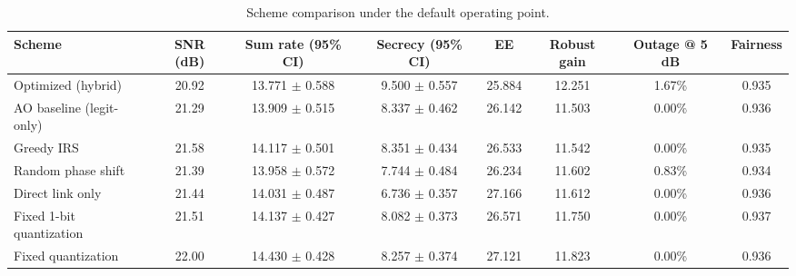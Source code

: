 \begin{table}[t]
\caption{Scheme comparison under the default operating point.}
\label{tab:comparison}
\centering
\begin{tabular}{lccccccc}
\hline
Scheme & SNR (dB) & Sum rate (95\% CI) & Secrecy (95\% CI) & EE & Robust gain & Outage @ 5 dB & Fairness \\
\hline
Optimized (hybrid) & 20.92 & 13.771 $\pm$ 0.588 & 9.500 $\pm$ 0.557 & 25.884 & 12.251 & 1.67\% & 0.935 \\
AO baseline (legit-only) & 21.29 & 13.909 $\pm$ 0.515 & 8.337 $\pm$ 0.462 & 26.142 & 11.503 & 0.00\% & 0.936 \\
Greedy IRS & 21.58 & 14.117 $\pm$ 0.501 & 8.351 $\pm$ 0.434 & 26.533 & 11.542 & 0.00\% & 0.935 \\
Random phase shift & 21.39 & 13.958 $\pm$ 0.572 & 7.744 $\pm$ 0.484 & 26.234 & 11.602 & 0.83\% & 0.934 \\
Direct link only & 21.44 & 14.031 $\pm$ 0.487 & 6.736 $\pm$ 0.357 & 27.166 & 11.612 & 0.00\% & 0.936 \\
Fixed 1-bit quantization & 21.51 & 14.137 $\pm$ 0.427 & 8.082 $\pm$ 0.373 & 26.571 & 11.750 & 0.00\% & 0.937 \\
Fixed quantization & 22.00 & 14.430 $\pm$ 0.428 & 8.257 $\pm$ 0.374 & 27.121 & 11.823 & 0.00\% & 0.936 \\
\hline
\end{tabular}
\end{table}
